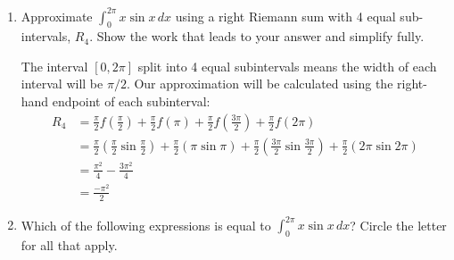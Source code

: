 \documentclass{article}
\begin{document}
\begin{enumerate}
\begin{problem}
    \begin{center}
    \end{center}   
    \pspace{-12pt}
\end{problem}

\begin{enumerate}
    \item 
    \begin{problem}
        Approximate $\displaystyle \int_0^{2\pi} x \sin x\,dx$ using a right Riemann sum with 4 equal sub-intervals, $R_4$. Show the work that leads to your answer and simplify fully.
    \end{problem}
    \pspace{\vfill}

    \begin{solution}
        The interval $[0, 2\pi]$ split into 4 equal subintervals means the width of each interval will be $\pi/2$. Our approximation will be calculated using the right-hand endpoint of each subinterval:
        \begin{align*}
            R_4 &= \tfrac{\pi}{2}f(\tfrac{\pi}{2}) + \tfrac{\pi}{2}f(\pi)+\tfrac{\pi}{2}f(\tfrac{3\pi}{2}) + \tfrac{\pi}{2}f(2\pi)\\
            &=\tfrac{\pi}{2}(\tfrac{\pi}{2}\sin\tfrac{\pi}{2}) + \tfrac{\pi}{2}(\pi\sin\pi)+
            \tfrac{\pi}{2}(\tfrac{3\pi}{2}\sin\tfrac{3\pi}{2})+
            \tfrac{\pi}{2}(2\pi\sin2\pi)\\
            &=\tfrac{\pi^2}{4}-\tfrac{3\pi^2}{4}\\
            &=\boxed{\frac{-\pi^2}{2}}
        \end{align*}
    \end{solution}

    \item
    \begin{problem}
        Which of the following expressions is equal to $\displaystyle \int_0^{2\pi} x \sin x\,dx$? Circle the letter for all that apply.
    \end{problem}


\end{enumerate}
\end{enumerate}
\end{document}
